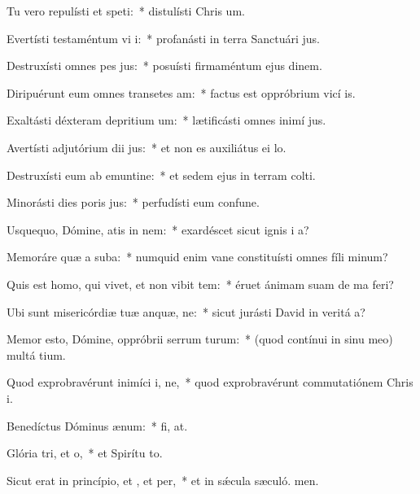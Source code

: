 \item Tu vero repulísti et speti:~* distulísti Chris um.
\item Evertísti testaméntum vi i:~* profanásti in terra Sanctuári jus.
\item Destruxísti omnes pes jus:~* posuísti firmaméntum ejus dinem.
\item Diripuérunt eum omnes transetes am:~* factus est oppróbrium vicí is.
\item Exaltásti déxteram depritium um:~* lætificásti omnes inimí jus.
\item Avertísti adjutórium dii jus:~* et non es auxiliátus ei  lo.
\item Destruxísti eum ab emuntine:~* et sedem ejus in terram colti.
\item Minorásti dies poris jus:~* perfudísti eum confune.
\item Usquequo, Dómine, atis in nem:~* exardéscet sicut ignis i a?
\item Memoráre quæ a suba:~* numquid enim vane constituísti omnes fíli minum?
\item Quis est homo, qui vivet, et non vibit tem:~* éruet ánimam suam de ma feri?
\item Ubi sunt misericórdiæ tuæ anquæ, ne:~* sicut jurásti David in veritá a?
\item Memor esto, Dómine, oppróbrii serrum turum:~* (quod contínui in sinu meo) multá tium.
\item Quod exprobravérunt inimíci i, ne,~* quod exprobravérunt commutatiónem Chris i.
\item Benedíctus Dóminus  ænum:~* fi, at.
\item Glória tri, et o,~* et Spirítu to.
\item Sicut erat in princípio, et , et per,~* et in sǽcula sæculó. men.
